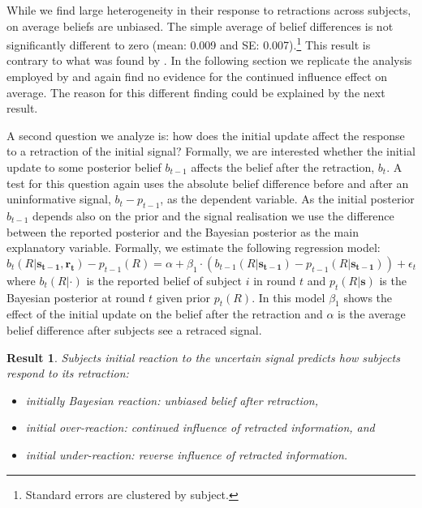 \documentclass{article}
\newtheorem{result}{Result}
\newenvironment{Result}{\begin{result} \rm }{\end{result}}
\begin{document}
While we find large heterogeneity in their response to retractions across subjects, on average beliefs are unbiased. The simple average of belief differences is not significantly different to zero (mean: 0.009 and SE: 0.007).\footnote{Standard errors are clustered by subject.} This result is contrary to what was found by \cite{Goncalves2022}. In the following section we replicate the analysis employed by \cite{Goncalves2022} and again find no evidence for the continued influence effect on average. The reason for this different finding could be explained by the next result.

A second question we analyze is: how does the initial update affect the response to a retraction of the initial signal? Formally, we are interested whether the initial update to some posterior belief $b_{t-1}$ affects the belief after the retraction, $b_t$. A test for this question again uses the absolute belief difference before and after an uninformative signal, $b_t-p_{t-1}$, as the dependent variable. As the initial posterior $b_{t-1}$ depends also on the prior and the signal realisation we use the difference between the reported posterior and the Bayesian posterior as the main explanatory variable. Formally, we estimate the following regression model:
\begin{equation}
\label{reg:retraction_simple}
    b_t(R|\mathbf{s_{t-1}}, \mathbf{r_t})-p_{t-1}(R)=\alpha + \beta_1 \cdot (b_{t-1}(R|\mathbf{s_{t-1}})-p_{t-1}(R|\mathbf{s_{t-1}}))+\epsilon_t
\end{equation}
where $b_t(R|\cdot)$ is the reported belief of subject $i$ in round $t$ and $p_t(R|\mathbf{s})$ is the Bayesian posterior at round $t$ given prior $p_t(R)$. In this model $\beta_1$ shows the effect of the initial update on the belief after the retraction and $\alpha$ is the average belief difference after subjects see a retraced signal. 

\begin{Result}
\label{result_retraction_previous}
Subjects initial reaction to the uncertain signal predicts how subjects respond to its retraction:
\begin{itemize}
    \item initially Bayesian reaction: unbiased belief after retraction,
    \item initial over-reaction: continued influence of retracted information, and
    \item initial under-reaction: reverse influence of retracted information.
\end{itemize}
\end{Result}
\end{document}
